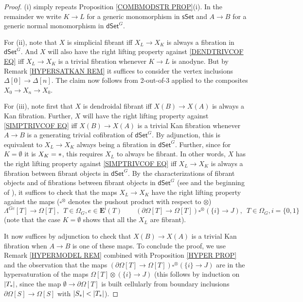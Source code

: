 \documentclass[a4paper,10pt
 ,draft
]{article}%
\begin{document}
\begin{proof}
(i) simply repeats Proposition \ref{COMBMODSTR PROP}(i). In the remainder we write $K \to L$ for a generic monomorphism in 
$\mathsf{sSet}$
and $A \to B$ for a generic normal monomorphism in $\mathsf{dSet}^G$.


For (ii), note that $X$ is simplicial fibrant iff 
$X_L \to X_K$ is always a fibration in $\mathsf{dSet}^G$. 
And $X$ will also have the right lifting property against \eqref{DENDTRIVCOF EQ} iff 
$X_L \to X_K$ is a trivial fibration whenever $K \to L$ is anodyne. But by Remark \ref{HYPERSATKAN REM}
it suffices to consider the vertex inclusions $\Delta[0] \to \Delta[n]$.
The claim now follows from 2-out-of-3 applied to the composites $X_0 \to X_n \to X_0$.


For (iii), note first that $X$ is dendroidal fibrant iff $X(B) \to X(A)$ is always a Kan fibration.
Further, $X$ will have the right lifting property against \eqref{SIMPTRIVCOF EQ} iff 
$X(B) \to X(A)$ is a trivial Kan fibration whenever $A\to B$ is a generating trivial cofibration of $\mathsf{dSet}^G$.
By adjunction, this is equivalent to 
$X_L \to X_K$ always being a fibration in $\mathsf{dSet}^G$.
Further, since for $K=\emptyset$ it is $X_{K}=\**$, this requires $X_L$ to always be fibrant. In other words, $X$ has the right lifting property against \eqref{SIMPTRIVCOF EQ} iff
$X_L \to X_K$ is always a fibration between fibrant objects in $\mathsf{dSet}^G$.
By the characterizations of fibrant objects and of fibrations between fibrant objects in $\mathsf{dSet}^G$ (see \cite[Prop. 8.8]{Per18} and the beginning of \cite[\S 8.1]{Per18}), it suffices to check that the maps $X_L \to X_K$ have the right lifting property against the maps 
($\square^{\otimes}$ denotes the pushout product with respect to
$\otimes$)
\begin{equation}\label{FIBBFIB EQ}
	\Lambda^{G e} [T] \to \Omega[T],
	\phantom{1}
	T \in \Omega_G, e \in \boldsymbol{E}^{\mathsf{i}}(T)
\qquad
	\left( \partial\Omega[T] \to \Omega[T]\right) \square^{\otimes} \left( \{i\} \to J\right),
	\phantom{1}
	T \in \Omega_G, i = \{0,1\}
\end{equation}
(note that the case $K=\emptyset$ shows that all the $X_L$ are fibrant).

It now suffices by adjunction to check that $X(B) \to X(A)$ is a trivial Kan fibration when $A\to B$ is one of these maps.
To conclude the proof, we use Remark \ref{HYPERMODEL REM}
combined with Proposition \ref{HYPER PROP}
and the observation that the maps 
$\left( \partial\Omega[T] \to \Omega[T]\right) \square^{\otimes} \left( \{i\} \to J\right)$
are in the hypersaturation of the maps
$ \Omega[T] \otimes \left( \{i\} \to J\right)$
(this follows by induction on $|T_{\**}|$, since the map
$\emptyset \to \partial \Omega[T]$ is built cellularly from boundary inclusions
$\partial \Omega[S] \to \Omega[S]$ with $|S_{\**}|<|T_{\**}|$).
\end{proof}
\end{document}
